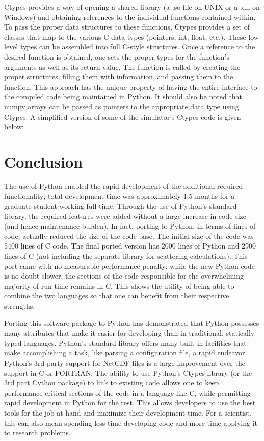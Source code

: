 \documentclass[twocolumn]{article}
\begin{document}
Ctypes provides a way of opening a shared library (a .so file on UNIX or a .dll
on Windows) and obtaining references to the individual functions contained
within. To pass the proper data structures to these functions, Ctypes provides
a set of classes that map to the various C data types (pointers, int, float, etc.).
These low level types can be assembled into full C-style structures. Once a reference
to the desired function is obtained, one sets the proper types for the function's
arguments as well as its return value. The function is called by creating the
proper structures, filling them with information, and passing them to the function.
This approach has the unique property of having the entire interface to the compiled
code being maintained in Python. It should also be noted that numpy arrays
can be passed as pointers to the appropriate data type using Ctypes.
A simplified version of some of the simulator's Ctypes code is given below:


\section{Conclusion}
The use of Python enabled the rapid development of the additional required
functionality; total development time was approximately 1.5 months for a graduate
student working full-time. Through the use of Python's standard library, the required
features were added without a large increase in code size (and hence maintenance
burden).  In fact, porting to Python, in terms of lines of code, actually reduced
the size of the code base. The initial size of the code was 5400 lines of C code.
The final ported version has 2000 lines of Python and 2900 lines of C (not including
the separate library for scattering calculations). This port came with no measurable
performance penalty; while the new Python code is no doubt slower, the sections of
the code responsible for the overwhelming majority of run time remains in C.
This shows the utility of being able to combine the two languages so that one
can benefit from their respective strengths.

Porting this software package to Python has demonstrated that Python possesses
many attributes that make it easier for developing than in traditional, statically
typed languages. Python's standard library offers many built-in facilities that
make accomplishing a task, like parsing a configuration file, a rapid endeavor.
Python's 3rd-party support for NetCDF files is a large improvement over the
support in C or FORTRAN.  The ability to use Python's Ctypes library (or the
3rd part Cython package) to link to existing code allows one to keep
performance-critical sections of the code in a language like C, while permitting
rapid development in Python for the rest. This allows developers to use the best
tools for the job at hand and maximize their development time. For a scientist,
this can also mean spending less time developing code and more time applying
it to research problems.
\end{document}
